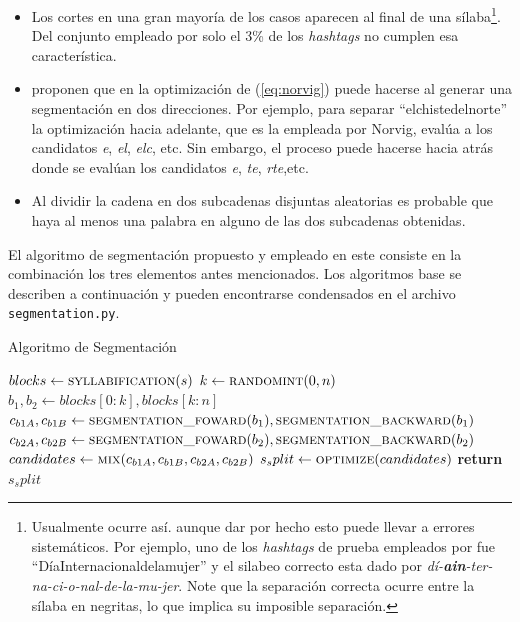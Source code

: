 \begin{itemize}
	\item Los cortes en una gran mayoría de los casos aparecen al final de una sílaba\footnote{Usualmente ocurre así. aunque dar por hecho esto puede llevar a errores sistemáticos. Por ejemplo, uno de los \textit{hashtags} de prueba empleados por \cite{cano2019segmentacion} fue ``DíaInternacionaldelamujer'' y el silabeo correcto esta dado por \textit{dí-\textbf{ain}-ter-na-ci-o-nal-de-la-mu-jer}. Note que la separación correcta ocurre entre la sílaba en negritas, lo que implica su imposible separación.}. Del conjunto empleado por \cite{cano2019segmentacion} solo el 3\% de los \textit{hashtags} no cumplen esa característica.
	
	\item \cite{gai2014bidirectional} proponen que en la optimización de (\ref{eq:norvig}) puede hacerse al generar una segmentación en dos direcciones. Por ejemplo, para separar ``elchistedelnorte'' la optimización hacia adelante, que es la empleada por Norvig, evalúa a los candidatos \textit{e}, \textit{el}, \textit{elc}, etc. Sin embargo, el proceso puede hacerse hacia atrás donde se evalúan los candidatos \textit{e}, \textit{te}, \textit{rte},etc.
	
	\item Al dividir la cadena en dos subcadenas disjuntas aleatorias es probable que haya al menos una palabra en alguno de las dos subcadenas obtenidas.
\end{itemize}

El algoritmo de segmentación propuesto y empleado en este consiste en la combinación los tres elementos antes mencionados. Los algoritmos base se describen a continuación y pueden encontrarse condensados en el archivo \texttt{segmentation.py}.

\begin{megaalgorithm}[h]
	\caption{Algoritmo de Segmentación}
	\label{alg:segmentation}
	\begin{algorithmic}[1]
		\State $blocks\gets \mbox{\textsc{syllabification}}(s)$
		\State $k\gets \mbox{\textsc{randomint}}(0,n)$ 
		\State $b_1,b_2\gets blocks[0:k],blocks[k:n]$
		\State $c_{b1A},c_{b1B}\gets \mbox{\textsc{segmentation\_foward}}(b_1),\mbox{\textsc{segmentation\_backward}}(b_1)$
		\State $c_{b2A},c_{b2B}\gets \mbox{\textsc{segmentation\_foward}}(b_2),\mbox{\textsc{segmentation\_backward}}(b_2)$
		\State $candidates\gets \mbox{\textsc{mix}}(c_{b1A},c_{b1B},c_{b2A},c_{b2B})$
		\State $s_split\gets \mbox{\textsc{optimize}}(candidates)$
		\State \textbf{return} $s_split$
		\EndProcedure
	\end{algorithmic}
\end{megaalgorithm}

